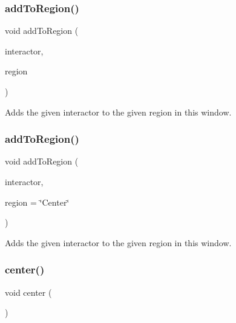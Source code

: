 \subsubsection{\texorpdfstring{add\+To\+Region()}{addToRegion()}\hspace{0.1cm}{\footnotesize\ttfamily [3/4]}}
{\footnotesize\ttfamily void add\+To\+Region (\begin{DoxyParamCaption}\item[{\mbox{\hyperlink{classGInteractor}{G\+Interactor}} \&}]{interactor,  }\item[{\mbox{\hyperlink{classGWindow_a81a01a86de31071a92e6cce0bab9bc4b}{Region}}}]{region }\end{DoxyParamCaption})\hspace{0.3cm}{\ttfamily [virtual]}}



Adds the given interactor to the given region in this window. 

\mbox{\label{classGWindow_a667ed0065e0bbb52a893904e7f2383bb}} 
\subsubsection{\texorpdfstring{add\+To\+Region()}{addToRegion()}\hspace{0.1cm}{\footnotesize\ttfamily [4/4]}}
{\footnotesize\ttfamily void add\+To\+Region (\begin{DoxyParamCaption}\item[{\mbox{\hyperlink{classGInteractor}{G\+Interactor}} \&}]{interactor,  }\item[{const std\+::string \&}]{region = {\ttfamily \char`\"{}Center\char`\"{}} }\end{DoxyParamCaption})\hspace{0.3cm}{\ttfamily [virtual]}}



Adds the given interactor to the given region in this window. 

\mbox{\label{classGWindow_a5013a22e5b1f902226b7394353f884ff}} 
\subsubsection{\texorpdfstring{center()}{center()}}
{\footnotesize\ttfamily void center (\begin{DoxyParamCaption}{ }\end{DoxyParamCaption})\hspace{0.3cm}{\ttfamily [virtual]}}



